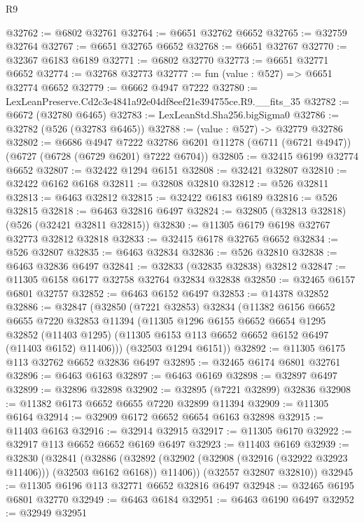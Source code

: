 \begin{lexlean}{R9}
\begin{coremodule}
@32762 := @6802 @32761
@32764 := @6651 @32762 @6652
@32765 := @32759 @32764
@32767 := @6651 @32765 @6652
@32768 := @6651 @32767
@32770 := @32367 @6183 @6189
@32771 := @6802 @32770
@32773 := @6651 @32771 @6652
@32774 := @32768 @32773
@32777 := fun (value : @527) => @6651 @32774 @6652
@32779 := @6662 @4947 @7222
@32780 := LexLeanPreserve.Cd2c3e4841a92e04df8eef21e394755ce.R9.__fits_35
@32782 := @6672 (@32780 @6465)
@32783 := LexLeanStd.Sha256.bigSigma0
@32786 := @32782 (@526 (@32783 @6465))
@32788 := (value : @527) -> @32779 @32786
@32802 := @6686
    @4947
    @7222
    @32786
    @6201
    @11278
    (@6711 (@6721 @4947))
    (@6727 (@6728 (@6729 @6201) @7222 @6704))
@32805 := @32415 @6199 @32774 @6652
@32807 := @32422 @1294 @6151
@32808 := @32421 @32807
@32810 := @32422 @6162 @6168
@32811 := @32808 @32810
@32812 := @526 @32811
@32813 := @6463 @32812
@32815 := @32422 @6183 @6189
@32816 := @526 @32815
@32818 := @6463 @32816 @6497
@32824 := @32805 (@32813 @32818) (@526 (@32421 @32811 @32815))
@32830 := @11305 @6179 @6198 @32767 @32773 @32812 @32818
@32833 := @32415 @6178 @32765 @6652
@32834 := @526 @32807
@32835 := @6463 @32834
@32836 := @526 @32810
@32838 := @6463 @32836 @6497
@32841 := @32833 (@32835 @32838) @32812
@32847 := @11305 @6158 @6177 @32758 @32764 @32834 @32838
@32850 := @32465 @6157 @6801 @32757
@32852 := @6463 @6152 @6497
@32853 := @14378 @32852
@32886 := @32847
    (@32850
      (@7221 @32853)
      @32834
      (@11382
        @6156
        @6652
        @6655
        @7220
        @32853
        @11394
        (@11305
          @1296
          @6155
          @6652
          @6654
          @1295
          @32852
          (@11403 @1295)
          (@11305 @6153 @113 @6652 @6652 @6152 @6497 (@11403 @6152) @11406)))
      (@32503 @1294 @6151))
@32892 := @11305 @6175 @113 @32762 @6652 @32836 @6497
@32895 := @32465 @6174 @6801 @32761
@32896 := @6463 @6163
@32897 := @6463 @6169
@32898 := @32897 @6497
@32899 := @32896 @32898
@32902 := @32895 (@7221 @32899) @32836
@32908 := @11382 @6173 @6652 @6655 @7220 @32899 @11394
@32909 := @11305 @6164
@32914 := @32909 @6172 @6652 @6654 @6163 @32898
@32915 := @11403 @6163
@32916 := @32914 @32915
@32917 := @11305 @6170
@32922 := @32917 @113 @6652 @6652 @6169 @6497
@32923 := @11403 @6169
@32939 := @32830
    (@32841
      (@32886
        (@32892 (@32902 (@32908 (@32916 (@32922 @32923 @11406))) (@32503 @6162 @6168)) @11406))
      (@32557 @32807 @32810))
@32945 := @11305 @6196 @113 @32771 @6652 @32816 @6497
@32948 := @32465 @6195 @6801 @32770
@32949 := @6463 @6184
@32951 := @6463 @6190 @6497
@32952 := @32949 @32951

\end{coremodule}
\end{lexlean}
